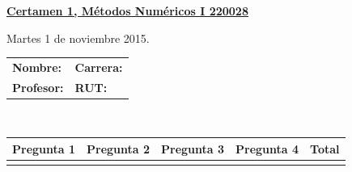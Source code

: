 \documentclass[11pt]{article}
\begin{document}
\hspace*{-1,5cm}

\vspace*{0.5cm} \centerline {\bf\underline{Certamen 1, M\'etodos Num\'ericos I 220028 }}
\centerline{\textrm{Martes 1 de noviembre 2015.}}  \vspace{0.2cm}


\begin{center}
 \begin{tabular}{p{}p{}}
	\textbf{Nombre:}   &\textbf{Carrera:}\\
	\textbf{Profesor:} & \textbf{ RUT:}
 \end{tabular}
 \\
 \vspace{0.2cm}
 \begin{tabular}{||p{2cm}|p{2cm}|p{2cm}|p{2cm}|p{2cm}||}
 \hline
 Pregunta 1 &  Pregunta 2 &Pregunta 3 &Pregunta 4 &     Total\\
 \hline

  \vspace{1.5cm} & &  & &    \\
 \hline
 \end{tabular}
 \end{center}
\end{document}
